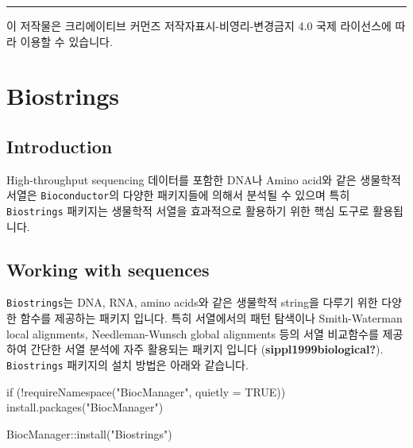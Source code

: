 \documentclass[
  a4paper,
]{book}
\newenvironment{Shaded}{\begin{snugshade}}{\end{snugshade}}
\newcommand{\AttributeTok}[1]{\textcolor[rgb]{0.40,0.45,0.13}{#1}}
\newcommand{\ConstantTok}[1]{\textcolor[rgb]{0.56,0.35,0.01}{#1}}
\newcommand{\ControlFlowTok}[1]{\textcolor[rgb]{0.00,0.23,0.31}{#1}}
\newcommand{\FunctionTok}[1]{\textcolor[rgb]{0.28,0.35,0.67}{#1}}
\newcommand{\NormalTok}[1]{\textcolor[rgb]{0.00,0.23,0.31}{#1}}
\newcommand{\SpecialCharTok}[1]{\textcolor[rgb]{0.37,0.37,0.37}{#1}}
\newcommand{\StringTok}[1]{\textcolor[rgb]{0.13,0.47,0.30}{#1}}
\begin{document}
\begin{center}\rule{0.5\linewidth}{0.5pt}\end{center}

이 저작물은 크리에이티브 커먼즈 저작자표시-비영리-변경금지 4.0 국제
라이선스에 따라 이용할 수 있습니다.


\hypertarget{biostrings}{%
\chapter{Biostrings}\label{biostrings}}

\hypertarget{introduction-5}{%
\section{Introduction}\label{introduction-5}}

High-throughput sequencing 데이터를 포함한 DNA나 Amino acid와 같은
생물학적 서열은 \texttt{Bioconductor}의 다양한 패키지들에 의해서 분석될
수 있으며 특히 \texttt{Biostrings} 패키지는 생물학적 서열을 효과적으로
활용하기 위한 핵심 도구로 활용됩니다.

\hypertarget{working-with-sequences}{%
\section{Working with sequences}\label{working-with-sequences}}

\texttt{Biostrings}는 DNA, RNA, amino acids와 같은 생물학적 string을
다루기 위한 다양한 함수를 제공하는 패키지 입니다. 특히 서열에서의 패턴
탐색이나 Smith-Waterman local alignments, Needleman-Wunsch global
alignments 등의 서열 비교함수를 제공하여 간단한 서열 분석에 자주
활용되는 패키지 입니다 (\textbf{sippl1999biological?}).
\texttt{Biostrings} 패키지의 설치 방법은 아래와 같습니다.

\begin{Shaded}
\begin{Highlighting}[]
\ControlFlowTok{if}\NormalTok{ (}\SpecialCharTok{!}\FunctionTok{requireNamespace}\NormalTok{(}\StringTok{"BiocManager"}\NormalTok{, }\AttributeTok{quietly =} \ConstantTok{TRUE}\NormalTok{))}
    \FunctionTok{install.packages}\NormalTok{(}\StringTok{"BiocManager"}\NormalTok{)}

\NormalTok{BiocManager}\SpecialCharTok{::}\FunctionTok{install}\NormalTok{(}\StringTok{"Biostrings"}\NormalTok{)}
\end{Highlighting}
\end{Shaded}
\end{document}
